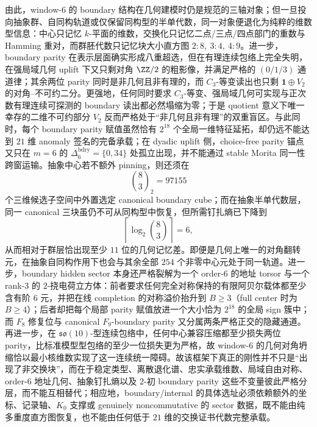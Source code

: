 





\noindent
由此，window-\(6\) 的 boundary 结构在几何建模时仍是规范的三轴对象；但一旦投向抽象群、自同构轨道或仅保留同构型的半单代数，同一对象便退化为纯粹的维数型信息：中心只记忆 \(k\)-平面的维数，交换化只记忆二点/三点/四点部门的重数与 Hamming 重对，而群胚代数只记忆块大小直方图 \(2:8,\ 3:4,\ 4:9\)。进一步，boundary parity 在表示层面确实形成八重超选，但在有理连续包络上完全失明，在强局域几何 uplift 下又只剩对角 \(\ZZ/2\) 的粗影像，并满足严格的 \((0/1/3)\) 通道律；其余两位 parity 同时是非几何且非有理的，而 \(C_3\)-等变读出也只剩 \(\mathbf 1\oplus V_2\) 的对角--不可约二分。更强地，任何同时要求 \(C_3\)-等变、强局域几何可实现与正次数有理连续可探测的 boundary 读出都必然塌缩为零；于是 quotient 意义下唯一幸存的二维不可约部分 \(V_2\) 反而严格处于“非几何且非有理”的双重盲区。与此同时，每个 boundary parity 赋值虽然恰有 \(2^{18}\) 个全局一维特征延拓，却仍远不能达到 \(21\) 维 anomaly 签名的完备承载；在 dyadic uplift 侧，choice-free parity 锚点又只在 \(m=6\) 的 \(\Delta_6^{\mathrm{bdry}}=\{0,34\}\) 处孤立出现，并不能通过 stable Morita 同一性跨窗运输。抽象中心若不额外 pinning，则还须在
\[
\binom{8}{3}_2=97155
\]
个三维候选子空间中外置选定 canonical boundary cube；而在抽象半单代数层，同一 canonical 三块虽仍不可从同构型中恢复，但所需钉扎熵已下降到
\[
\left\lceil\log_2 \binom{8}{3}\right\rceil=6,
\]
从而相对于群层恰出现至少 \(11\) 位的几何记忆差。即便是几何上唯一的对角翻转元，在抽象自同构作用下也会与其余全部 \(254\) 个非零中心元处于同一轨道。进一步，boundary hidden sector 本身还严格裂解为一个 order-\(6\) 的地址 torsor 与一个 rank-\(3\) 的 \(2\)-挠电荷立方体：前者要求任何完全对称保持的有限阿贝尔载体都至少含有阶 \(6\) 元，并把在线 completion 的对称溢价抬升到 \(B\ge 3\)（full center 时为 \(B\ge 4\)）；后者却把每个局部 parity 赋值放进一个大小恰为 \(2^{18}\) 的全局 sign 簇中；而 \(F_8\) 修复位与 canonical \(F_9\)-boundary parity 又分属两条严格正交的隐藏通道。再进一步，在 \(\mathfrak{so}(10)\)-型连续包络中，任何中心兼容压缩都至少损失两位 parity，比标准模型型包络的至少一位损失更为严格，故 window-\(6\) 的几何对角坍缩恰以最小核维数实现了这一连续统一障碍。故该框架下真正的刚性并不只是“出现了非交换块”，而在于稳定类型、离散退化谱、忠实承载维数、局域自由对称、order-\(6\) 地址几何、抽象钉扎熵以及 \(2\)-初 boundary parity 这些不变量彼此严格分层，而不能互相替代；相应地，boundary/internal 的具体选址必须依赖额外的坐标、记录轴、\(K_0\) 支撑或 genuinely noncommutative 的 sector 数据，既不能由纯多重度直方图恢复，也不能由任何低于 \(21\) 维的交换证书代数完整承载。

\endinput
